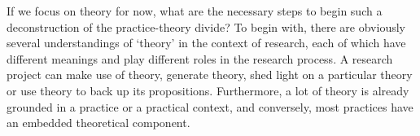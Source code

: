 \documentclass[12pt]{article}
\begin{document}

If we focus on theory for now, what are the necessary steps to begin such a deconstruction of the practice-theory divide?  To begin with, there are obviously several understandings of `theory' in the context of research, each of which have different meanings and play different roles in the research process. A research project can make use of theory, generate theory, shed light on a particular theory or use theory to back up its propositions. Furthermore, a lot of theory is already grounded in a practice or a practical context, and conversely, most practices have an embedded theoretical component. 


\end{document}
